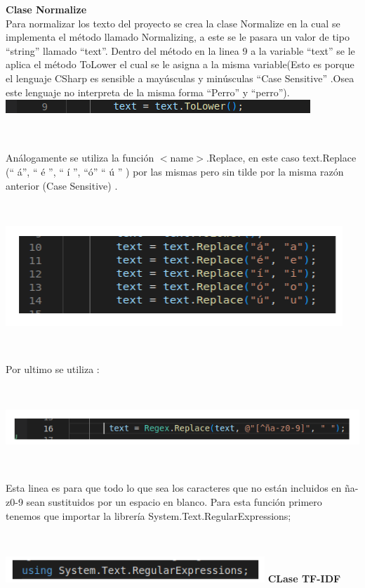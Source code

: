 \documentclass{article}
\begin{document}
\newpage
{\small
\textbf{\large Clase Normalize }
\\
Para normalizar los texto del proyecto se crea la clase Normalize en la cual se implementa el
método llamado Normalizing, a este se le pasara un valor de tipo “string” llamado “text”. Dentro
del método en la linea 9 a la variable “text” se le aplica el método ToLower el cual se le asigna a la
misma variable(Esto es porque el lenguaje CSharp es sensible a mayúsculas y minúsculas “Case
Sensitive” .Osea este lenguaje no interpreta de la misma forma “Perro” y “perro”).
\\

\centering
\includegraphics[height = 0.5 cm ]{Captura desde 2023-07-17 22-27-30.png}

\

Análogamente se utiliza la función $<$name$>$.Replace, en este caso text.Replace\\(“ á”, “ é ”, “ í ”, “ó” “ ú ” ) por las mismas pero sin tilde por la misma razón anterior (Case Sensitive) .

\ 

\centering
\includegraphics[height = 3 cm ]{Captura desde 2023-07-17 22-42-56.png}

\

Por ultimo se utiliza :

\

\centering
\includegraphics[height = 1.2 cm ]{Captura desde 2023-07-17 22-46-16.png}

\

Esta linea es para que todo lo que sea los caracteres que no están incluidos en ña-z0-9 sean
sustituidos por un espacio en blanco. Para esta función primero tenemos que importar la librería
System.Text.RegularExpressions;

\

\centering
\includegraphics[height = 0.8 cm ]{Captura desde 2023-07-19 13-00-55.png}
\newpage
\textbf{\large CLase TF-IDF }

}
\end{document}
